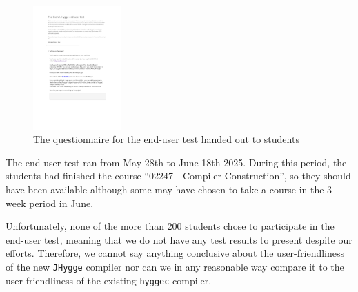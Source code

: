 \begin{figure}[H]
\centering
\includegraphics[width=0.3\textwidth]{Pictures/the_grand_jhygge_end_user_test.pdf}
\caption{The questionnaire for the end-user test handed out to students}
\label{fig:end_user_test}
\end{figure}

The end-user test ran from May 28th to June 18th 2025. During this period, the students had finished the course ``02247 - Compiler Construction'',
so they should have been available although some may have chosen to take a course in the 3-week period in June.

Unfortunately, none of the more than 200 students chose to participate in the end-user test, meaning that we do not have any test results
to present despite our efforts. Therefore, we cannot say anything conclusive about the user-friendliness of the new \texttt{JHygge} compiler
nor can we in any reasonable way compare it to the user-friendliness of the existing \texttt{hyggec} compiler.
